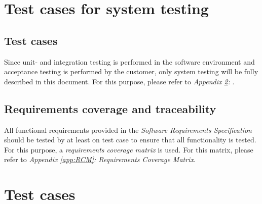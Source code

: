 \documentclass[12pt,titlepage]{article}
\begin{document}

\section{Test cases for system testing}
\label{sec:test-cases-for-system-testing}

\subsection{Test cases}
\label{subsec:test-cases}

Since unit- and integration testing is performed in the software environment and
acceptance testing is performed by the customer, only system testing will be
fully described in this document. For this purpose, please refer to
\textit{Appendix \ref{app:test-cases}: }.

\subsection{Requirements coverage and traceability}
\label{subsec:requirements-coverage-and-testability}

All functional requirements provided in the \textit{Software Requirements
Specification} should be tested by at least on test case to ensure that all
functionality is tested. For this purpose, a \textit{requirements coverage
matrix} is used. For this matrix, please refer to \textit{Appendix
\ref{app:RCM}: Requirements Coverage Matrix}.



\newpage
\appendix

\section{Test cases}
\label{app:test-cases}

\begin{usecase}
\end{usecase}
\end{document}

